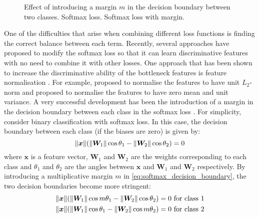 \documentclass[conference]{IEEEtran}
\DeclarePairedDelimiter\norm{\lVert}{\rVert}
\begin{document}
\begin{figure}[tb]
    \centering
    \hspace{0.05\linewidth}
    \caption{Effect of introducing a margin $m$ in the decision boundary between two classes.  Softmax loss.  Softmax loss with margin.}
    \label{fig:decision_boundaries}
\end{figure}

One of the difficulties that arise when combining different loss functions is finding the correct balance between each term. Recently, several approaches have proposed to modify the softmax loss so that it can learn discriminative features with no need to combine it with other losses. One approach that has been shown to increase the discriminative ability of the bottleneck features is feature normalisation \cite{ranjan2017l2,hasnat2017deepvisage}. For example, \cite{ranjan2017l2} proposed to normalise the features to have unit $L_2$-norm and \cite{hasnat2017deepvisage} proposed to normalise the features to have zero mean and unit variance. A very successful development has been the introduction of a margin in the decision boundary between each class in the softmax loss \cite{liu2016large}. For simplicity, consider binary classification with softmax loss. In this case, the decision boundary between each class (if the biases are zero) is given by:
\begin{equation}
    \norm{\bm{x}}(\norm{\bm{W}_1}\cos\theta_1-\norm{\bm{W}_2}\cos\theta_2)=0\label{eq:softmax_decision_boundary}
\end{equation}
where $\bm{x}$ is a feature vector, $\bm{W}_1$ and $\bm{W}_2$ are the weights corresponding to each class and $\theta_1$ and $\theta_2$ are the angles between $\bm{x}$ and $\bm{W}_1$ and $\bm{W}_2$ respectively. By introducing a multiplicative margin $m$ in \cref{eq:softmax_decision_boundary}, the two decision boundaries become more stringent:
\begin{align}
    \norm{\bm{x}}(\norm{\bm{W}_1}\cos m\theta_1-\norm{\bm{W}_2}\cos\theta_2)=0 \text{ for class 1}\label{eq:softmax_margin_decision_boundary_1} \\
    \norm{\bm{x}}(\norm{\bm{W}_1}\cos\theta_1-\norm{\bm{W}_2}\cos m\theta_2)=0 \text{ for class 2}\label{eq:softmax_margin_decision_boundary_2}
\end{align}
\end{document}
